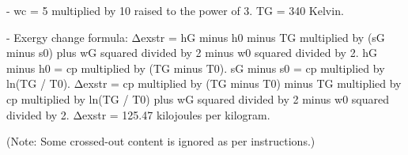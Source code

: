 - wc = 5 multiplied by 10 raised to the power of 3.  
  TG = 340 Kelvin.  

- Exergy change formula:  
  Δexstr = hG minus h0 minus TG multiplied by (sG minus s0) plus wG squared divided by 2 minus w0 squared divided by 2.  
  hG minus h0 = cp multiplied by (TG minus T0).  
  sG minus s0 = cp multiplied by ln(TG / T0).  
  Δexstr = cp multiplied by (TG minus T0) minus TG multiplied by cp multiplied by ln(TG / T0) plus wG squared divided by 2 minus w0 squared divided by 2.  
  Δexstr = 125.47 kilojoules per kilogram.  

(Note: Some crossed-out content is ignored as per instructions.)